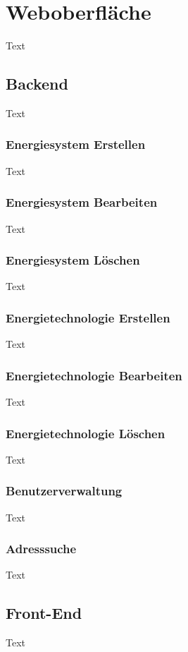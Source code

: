 \section{Weboberfläche}
Text

\subsection{Backend}
Text
\subsubsection{Energiesystem Erstellen}
Text

\subsubsection{Energiesystem Bearbeiten}
Text

\subsubsection{Energiesystem Löschen}
Text

\subsubsection{Energietechnologie Erstellen}
Text

\subsubsection{Energietechnologie Bearbeiten}
Text

\subsubsection{Energietechnologie Löschen}
Text

\subsubsection{Benutzerverwaltung}
Text

\subsubsection{Adresssuche}
Text


\subsection{Front-End}
Text

